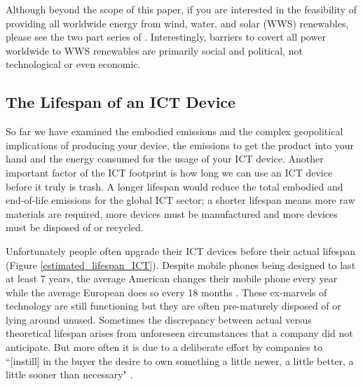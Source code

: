 \documentclass{article}
\begin{document}
Although beyond the scope of this paper, if you are interested in the feasibility of providing all worldwide energy from wind, water, and solar (WWS) renewables, please see the two part series of \cite{jacobson2011providing, delucchi2011providing}. Interestingly, barriers to covert all power worldwide to WWS renewables are primarily social and political, not technological or even economic.


\subsection{The Lifespan of an ICT Device}
So far we have examined the embodied emissions and the complex geopolitical implications of producing your device, the emissions to get the product into your hand and the energy consumed for the usage of your ICT device. Another important factor of the ICT footprint is how long we can use an ICT device before it truly is trash. A longer lifespan would reduce the total embodied and end-of-life emissions for the global ICT sector; a shorter lifespan means more raw materials are required, more devices must be manufactured and more devices must be disposed of or recycled. 

Unfortunately people often upgrade their ICT devices before their actual lifespan (Figure \ref{estimated_lifespan_ICT}). Despite mobile phones being designed to last at least 7 years, the average American changes their mobile phone every year while the average European does so every 18 months \cite{bournay2006vital, webfx2016lifespanICT}. These ex-marvels of technology are still functioning but they are often pre-maturely disposed of or lying around unused. Sometimes the discrepancy between actual versus theoretical lifespan arises from unforeseen circumstances that a company did not anticipate. But more often it is due to a deliberate effort by companies to ``[instill] in the buyer the desire to own something a little newer, a little better, a little sooner than necessary" \cite{stevens1960planned}.
\end{document}
